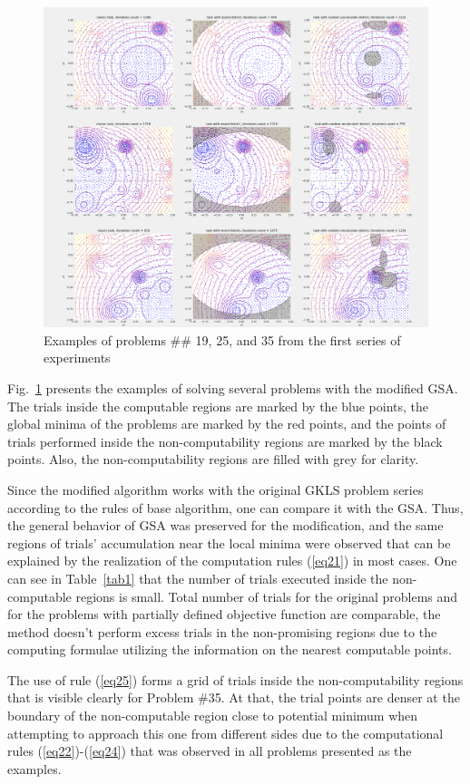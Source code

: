 \documentclass[runningheads]{llncs}
\begin{document}
\begin{figure}[h]
\includegraphics[width=\textwidth]{fig6.png}
\caption{Examples of problems \#\# 19, 25, and 35 from the first series of experiments} \label{fig6}
\end{figure}

Fig.~\ref{fig6} presents the examples of solving several problems with the modified GSA. The trials inside the computable regions are marked by the blue points, the global minima of the problems are marked by the red points, and the points of trials performed inside the non-computability regions are marked by the black points. Also, the non-computability regions are filled with grey for clarity.

Since the modified algorithm works with the original GKLS problem series according to the rules of base algorithm, one can compare it with the GSA. Thus, the general behavior of GSA was preserved for the modification, and the same regions of trials' accumulation near the local minima were observed that can be explained by the realization of the  computation rules (\ref{eq21}) in most cases. One can see in Table~\ref{tab1} that the number of trials executed inside the non-computable regions is small. Total number of trials for the original problems and for the problems with partially defined objective function are comparable, the method doesn't perform excess trials in the non-promising regions due to the computing formulae utilizing the information on the nearest computable points.

The use of rule (\ref{eq25}) forms a grid of trials inside the non-computability regions that is visible clearly for Problem \#35. At that, the trial points are denser at the boundary of the non-computable region close to potential minimum when attempting to approach this one from different sides due to the computational rules (\ref{eq22})-(\ref{eq24}) that was observed in all problems presented as the examples. 
\end{document}
